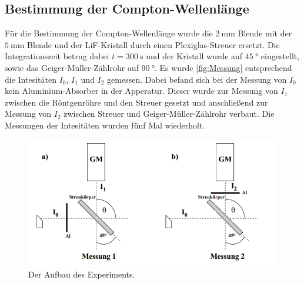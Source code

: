 \subsection{Bestimmung der Compton-Wellenlänge}
Für die Bestimmung der Compton-Wellenlänge wurde die $\SI{2}{\milli\meter}$ Blende mit der $\SI{5}{\milli\meter}$ Blende und
der LiF-Kristall durch einen Plexiglas-Streuer ersetzt. Die Integrationszeit betrug dabei $t = \SI{300}{\second}$ und der Kristall
wurde auf $\SI{45}{\degree}$ eingestellt, sowie das Geiger-Müller-Zählrohr auf $\SI{90}{\degree}$.
Es wurde \autoref{fig:Messung} entsprechend die Intesitäten $I_0$, $I_1$ und $I_2$ gemessen.
Dabei befand sich bei der Messung von $I_0$ kein Aluminium-Absorber in der Apperatur. Dieser wurde zur Messung von $I_1$
zwischen die Röntgenröhre und den Streuer gesetzt und anschließend zur Messung von $I_2$ zwischen Streuer und
Geiger-Müller-Zählrohr verbaut. Die Messungen der Intesitäten wurden fünf Mal wiederholt.
\begin{figure}[H]
    \centering
    \includegraphics[scale=1]{content/Messung.png}
    \caption{Der Aufbau des Experiments.\cite{sample}}
    \label{fig:Messung}
\end{figure}

